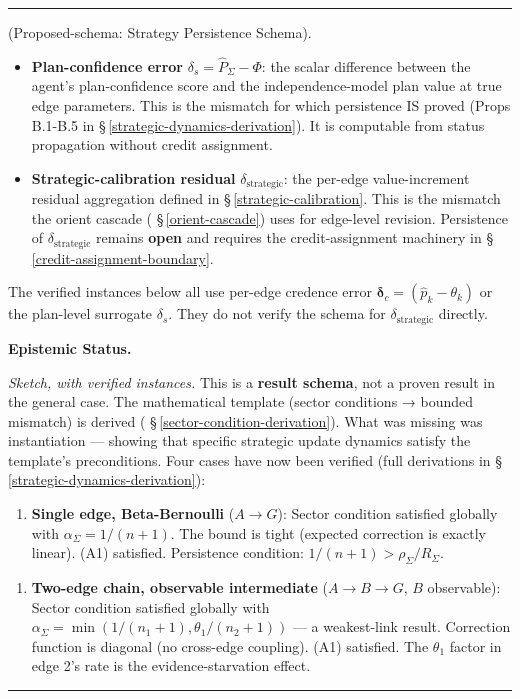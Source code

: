 \documentclass[11pt,oneside]{article}
\newcounter{claim}[section]
\renewcommand{\theclaim}{\thesection.\arabic{claim}}
\newenvironment{segment}[2]{%
  \refstepcounter{claim}%
  \bigskip\noindent\hrule\smallskip
  \noindent{\bfseries #1~\theclaim}\enskip(#2).\par\smallskip
  \noindent\ignorespaces
}{%
  \par\smallskip\noindent\hrule\bigskip
}
\newenvironment{remark}[1][]{\begin{segment}{Remark}{#1}}{\end{segment}}
\begin{document}
\begin{remark}[Proposed-schema: Strategy Persistence Schema]
\begin{itemize}
  \item \textbf{Plan-confidence error} $\delta_s = \hat P_\Sigma - \Phi$: the scalar difference between the agent's plan-confidence score and the independence-model plan value at true edge parameters. This is the mismatch for which persistence IS proved (Props B.1-B.5 in \S\,\ref{strategic-dynamics-derivation}). It is computable from status propagation without credit assignment.
  \item \textbf{Strategic-calibration residual} $\delta_{\text{strategic}}$: the per-edge value-increment residual aggregation defined in \S\,\ref{strategic-calibration}. This is the mismatch the orient cascade ( \S\,\ref{orient-cascade}) uses for edge-level revision. Persistence of $\delta_{\text{strategic}}$ remains \textbf{open} and requires the credit-assignment machinery in \S\,\ref{credit-assignment-boundary}.
\end{itemize}


The verified instances below all use per-edge credence error $\boldsymbol\delta_c = (\hat p_k - \theta_k)$ or the plan-level surrogate $\delta_s$. They do not verify the schema for $\delta_{\text{strategic}}$ directly.


\medskip\noindent\textbf{Epistemic Status.}


\textit{Sketch, with verified instances.} This is a \textbf{result schema}, not a proven result in the general case. The mathematical template (sector conditions → bounded mismatch) is derived ( \S\,\ref{sector-condition-derivation}). What was missing was instantiation — showing that specific strategic update dynamics satisfy the template's preconditions. Four cases have now been verified (full derivations in \S\,\ref{strategic-dynamics-derivation}):

\begin{enumerate}
  \item \textbf{Single edge, Beta-Bernoulli} ($A \to G$): Sector condition satisfied globally with $\alpha_\Sigma = 1/(n+1)$. The bound is tight (expected correction is exactly linear). (A1) satisfied. Persistence condition: $1/(n+1) > \rho_\Sigma / R_\Sigma$.
\end{enumerate}


\begin{enumerate}
  \item \textbf{Two-edge chain, observable intermediate} ($A \to B \to G$, $B$ observable): Sector condition satisfied globally with $\alpha_\Sigma = \min(1/(n_1+1), \theta_1/(n_2+1))$ — a weakest-link result. Correction function is diagonal (no cross-edge coupling). (A1) satisfied. The $\theta_1$ factor in edge 2's rate is the evidence-starvation effect.
\end{enumerate}



\end{remark}
\end{document}

